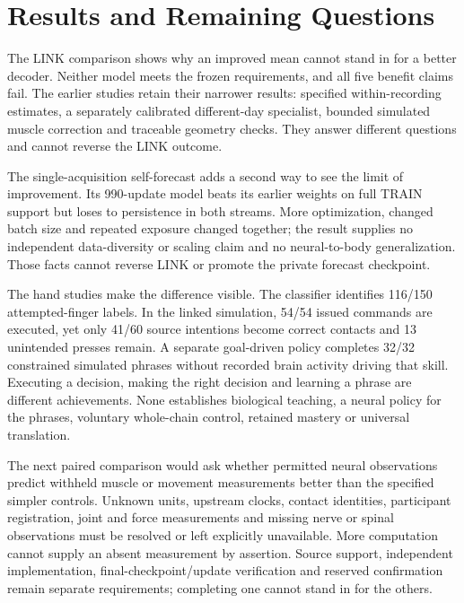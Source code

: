 




\section{Results and Remaining Questions}

The LINK comparison shows why an improved mean cannot stand in for a better decoder. Neither model meets the frozen requirements, and all five benefit claims fail. The earlier studies retain their narrower results: specified within-recording estimates, a separately calibrated different-day specialist, bounded simulated muscle correction and traceable geometry checks. They answer different questions and cannot reverse the LINK outcome.

The single-acquisition self-forecast adds a second way to see the limit of improvement. Its 990-update model beats its earlier weights on full TRAIN support but loses to persistence in both streams. More optimization, changed batch size and repeated exposure changed together; the result supplies no independent data-diversity or scaling claim and no neural-to-body generalization. Those facts cannot reverse LINK or promote the private forecast checkpoint.

The hand studies make the difference visible. The classifier identifies 116/150 attempted-finger labels. In the linked simulation, 54/54 issued commands are executed, yet only 41/60 source intentions become correct contacts and 13 unintended presses remain. A separate goal-driven policy completes 32/32 constrained simulated phrases without recorded brain activity driving that skill. Executing a decision, making the right decision and learning a phrase are different achievements. None establishes biological teaching, a neural policy for the phrases, voluntary whole-chain control, retained mastery or universal translation.

The next paired comparison would ask whether permitted neural observations predict withheld muscle or movement measurements better than the specified simpler controls. Unknown units, upstream clocks, contact identities, participant registration, joint and force measurements and missing nerve or spinal observations must be resolved or left explicitly unavailable. More computation cannot supply an absent measurement by assertion. Source support, independent implementation, final-checkpoint/update verification and reserved confirmation remain separate requirements; completing one cannot stand in for the others.

